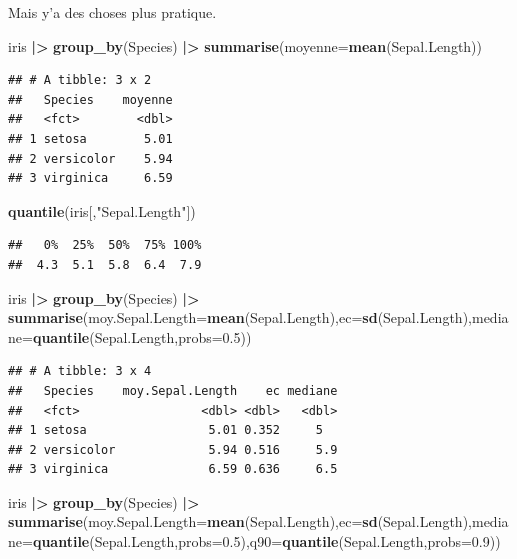 \documentclass[
]{book}
\newenvironment{Shaded}{\begin{snugshade}}{\end{snugshade}}
\newcommand{\AttributeTok}[1]{\textcolor[rgb]{0.13,0.29,0.53}{#1}}
\newcommand{\FloatTok}[1]{\textcolor[rgb]{0.00,0.00,0.81}{#1}}
\newcommand{\FunctionTok}[1]{\textcolor[rgb]{0.13,0.29,0.53}{\textbf{#1}}}
\newcommand{\NormalTok}[1]{#1}
\newcommand{\SpecialCharTok}[1]{\textcolor[rgb]{0.81,0.36,0.00}{\textbf{#1}}}
\newcommand{\StringTok}[1]{\textcolor[rgb]{0.31,0.60,0.02}{#1}}
\begin{document}
Mais y'a des choses plus pratique.

\begin{Shaded}
\begin{Highlighting}[]
\NormalTok{iris }\SpecialCharTok{|\textgreater{}} \FunctionTok{group\_by}\NormalTok{(Species) }\SpecialCharTok{|\textgreater{}} \FunctionTok{summarise}\NormalTok{(}\AttributeTok{moyenne=}\FunctionTok{mean}\NormalTok{(Sepal.Length))}
\end{Highlighting}
\end{Shaded}

\begin{verbatim}
## # A tibble: 3 x 2
##   Species    moyenne
##   <fct>        <dbl>
## 1 setosa        5.01
## 2 versicolor    5.94
## 3 virginica     6.59
\end{verbatim}

\begin{Shaded}
\begin{Highlighting}[]
\FunctionTok{quantile}\NormalTok{(iris[,}\StringTok{"Sepal.Length"}\NormalTok{])}
\end{Highlighting}
\end{Shaded}

\begin{verbatim}
##   0%  25%  50%  75% 100% 
##  4.3  5.1  5.8  6.4  7.9
\end{verbatim}

\begin{Shaded}
\begin{Highlighting}[]
\NormalTok{iris }\SpecialCharTok{|\textgreater{}} \FunctionTok{group\_by}\NormalTok{(Species) }\SpecialCharTok{|\textgreater{}} \FunctionTok{summarise}\NormalTok{(}\AttributeTok{moy.Sepal.Length=}\FunctionTok{mean}\NormalTok{(Sepal.Length),}\AttributeTok{ec=}\FunctionTok{sd}\NormalTok{(Sepal.Length),}\AttributeTok{mediane=}\FunctionTok{quantile}\NormalTok{(Sepal.Length,}\AttributeTok{probs=}\FloatTok{0.5}\NormalTok{))}
\end{Highlighting}
\end{Shaded}

\begin{verbatim}
## # A tibble: 3 x 4
##   Species    moy.Sepal.Length    ec mediane
##   <fct>                 <dbl> <dbl>   <dbl>
## 1 setosa                 5.01 0.352     5  
## 2 versicolor             5.94 0.516     5.9
## 3 virginica              6.59 0.636     6.5
\end{verbatim}

\begin{Shaded}
\begin{Highlighting}[]
\NormalTok{iris }\SpecialCharTok{|\textgreater{}} \FunctionTok{group\_by}\NormalTok{(Species) }\SpecialCharTok{|\textgreater{}} \FunctionTok{summarise}\NormalTok{(}\AttributeTok{moy.Sepal.Length=}\FunctionTok{mean}\NormalTok{(Sepal.Length),}\AttributeTok{ec=}\FunctionTok{sd}\NormalTok{(Sepal.Length),}\AttributeTok{mediane=}\FunctionTok{quantile}\NormalTok{(Sepal.Length,}\AttributeTok{probs=}\FloatTok{0.5}\NormalTok{),}\AttributeTok{q90=}\FunctionTok{quantile}\NormalTok{(Sepal.Length,}\AttributeTok{probs=}\FloatTok{0.9}\NormalTok{))}
\end{Highlighting}
\end{Shaded}
\end{document}
